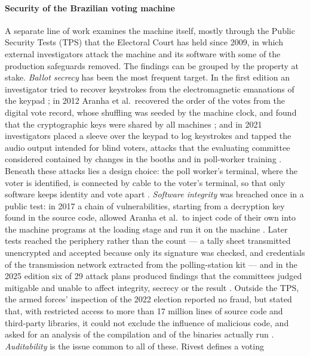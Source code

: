 \documentclass[fleqn,10pt]{SelfArx}
\begin{document}
\paragraph{Security of the Brazilian voting machine} A separate line of work
examines the machine itself, mostly through the Public Security Tests (TPS)
that the Electoral Court has held since 2009, in which external
investigators attack the machine and its software with some of the
production safeguards removed. The findings can be grouped by the property
at stake. \emph{Ballot secrecy} has been the most frequent target. In the
first edition an investigator tried to recover keystrokes from the
electromagnetic emanations of the keypad \cite{tse2022tpshist}; in 2012
Aranha et al.\ recovered the order of the votes from the digital vote
record, whose shuffling was seeded by the machine clock, and found that the
cryptographic keys were shared by all machines \cite{aranha2014}; and in
2021 investigators placed a sleeve over the keypad to log keystrokes and
tapped the audio output intended for blind voters, attacks that the
evaluating committee considered contained by changes in the booths and in
poll-worker training \cite{tse2021tps}. Beneath these attacks lies a design
choice: the poll worker's terminal, where the voter is identified, is
connected by cable to the voter's terminal, so that only software keeps
identity and vote apart \cite{aranha2018}. \emph{Software integrity} was
breached once in a public test: in 2017 a chain of vulnerabilities, starting
from a decryption key found in the source code, allowed Aranha et al.\ to
inject code of their own into the machine programs at the loading stage
and run it on the machine \cite{aranha2018}. Later tests reached the
periphery rather than the count --- a tally sheet transmitted unencrypted
and accepted because only its signature was checked, and credentials of the
transmission network extracted from the polling-station kit
\cite{tse2021tps} --- and in the 2025 edition six of 29 attack plans
produced findings that the committees judged mitigable and unable to affect
integrity, secrecy or the result \cite{tse2025tps}. Outside the TPS, the
armed forces' inspection of the 2022 election reported no fraud, but stated
that, with restricted access to more than 17 million lines of source code
and third-party libraries, it could not exclude the influence of malicious
code, and asked for an analysis of the compilation and of the binaries
actually run \cite{md2022,md2022nota}. \emph{Auditability} is the issue
common to all of these. Rivest \cite{rivest2008} defines a voting
\end{document}
